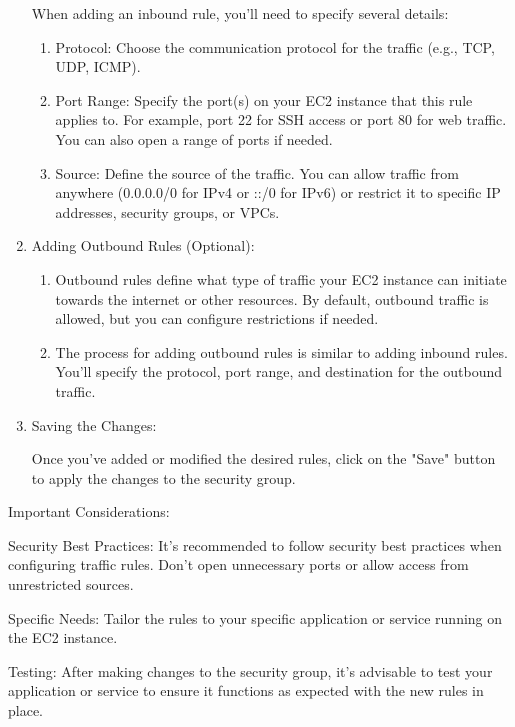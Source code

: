 \documentclass[11pt]{article}
\begin{document}
\begin{enumerate}
          When adding an inbound rule, you'll need to specify several details:
          \begin{enumerate}
              \item Protocol: Choose the communication protocol for the traffic (e.g., TCP, UDP, ICMP).
              \item Port Range: Specify the port(s) on your EC2 instance that this rule applies to. For example, port 22 for SSH access or port 80 for web traffic. You can also open a range of ports if needed.
              \item Source: Define the source of the traffic. You can allow traffic from anywhere (0.0.0.0/0 for IPv4 or ::/0 for IPv6) or restrict it to specific IP addresses, security groups, or VPCs.
          \end{enumerate}

    \item Adding Outbound Rules (Optional):
          \begin{enumerate}
              \item Outbound rules define what type of traffic your EC2 instance can initiate towards the internet or other resources. By default, outbound traffic is allowed, but you can configure restrictions if needed.
              \item The process for adding outbound rules is similar to adding inbound rules. You'll specify the protocol, port range, and destination for the outbound traffic.
          \end{enumerate}

    \item Saving the Changes:

          Once you've added or modified the desired rules, click on the "Save" button to apply the changes to the security group.

\end{enumerate}

Important Considerations:


Security Best Practices: It's recommended to follow security best practices when configuring traffic rules. Don't open unnecessary ports or allow access from unrestricted sources.

Specific Needs: Tailor the rules to your specific application or service running on the EC2 instance.

Testing: After making changes to the security group, it's advisable to test your application or service to ensure it functions as expected with the new rules in place.
\end{document}
